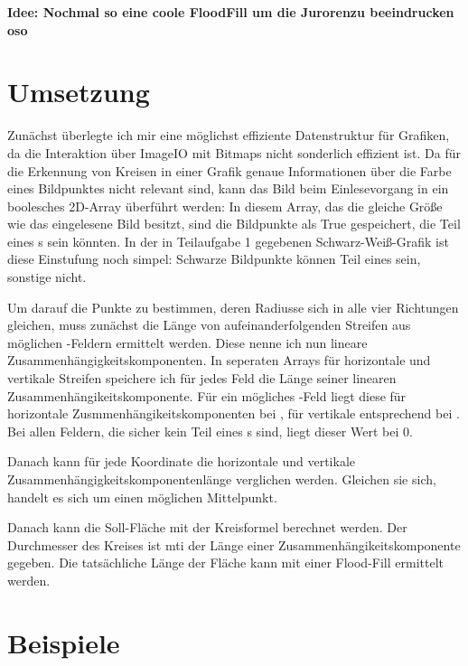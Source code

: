 \textbf{Idee: Nochmal so eine coole FloodFill um die Jurorenzu beeindrucken oso}
\section{Umsetzung}
Zunächst überlegte ich mir eine möglichst effiziente Datenstruktur für Grafiken, da die Interaktion über ImageIO mit Bitmaps nicht sonderlich effizient ist. Da für die Erkennung von Kreisen in einer Grafik genaue Informationen über die Farbe eines Bildpunktes nicht relevant sind, kann das Bild beim Einlesevorgang in ein boolesches 2D-Array überführt werden: In diesem Array, das die gleiche Größe wie das eingelesene Bild besitzt, sind die Bildpunkte als True gespeichert, die Teil eines \task{}s sein könnten. In der in Teilaufgabe 1 gegebenen Schwarz-Weiß-Grafik ist diese Einstufung noch simpel: Schwarze Bildpunkte können Teil eines \task sein, sonstige nicht.

Um darauf die Punkte zu bestimmen, deren Radiusse sich in alle vier Richtungen gleichen, muss zunächst die Länge von aufeinanderfolgenden Streifen aus möglichen \task{}-Feldern ermittelt werden. Diese nenne ich nun lineare Zusammenhängigkeitskomponenten. In seperaten Arrays für horizontale und vertikale Streifen speichere ich für jedes Feld die Länge seiner linearen Zusammenhängikeitskomponente. Für ein mögliches \task{}-Feld liegt diese für horizontale Zusmmenhängikeitskomponenten bei
, für vertikale entsprechend bei
. Bei allen Feldern, die sicher kein Teil eines \task{}s sind, liegt dieser Wert bei 0. 

Danach kann für jede Koordinate die horizontale und vertikale Zusammenhängigkeitskomponentenlänge verglichen werden. Gleichen sie sich, handelt es sich um einen möglichen Mittelpunkt.

Danach kann die Soll-Fläche mit der Kreisformel berechnet werden. Der Durchmesser des Kreises ist mti der Länge einer Zusammenhängikeitskomponente gegeben. Die tatsächliche Länge der Fläche kann mit einer Flood-Fill ermittelt werden.

\section{Beispiele}
